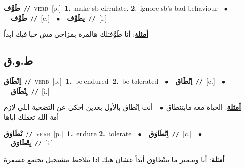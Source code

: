 \documentclass[10pt,a4paper,twoside]{article} %
\begin{document}
\begin{multicols}{2}
{\setlength\topsep{0pt}\textbf{\foreignlanguage{arabic}{طَوَّف}}\ {\color{gray}\texttt{//}\color{black}}\ \textsc{verb}\ [p.]\ \textbf{1.}~make sb circulate.  \textbf{2.}~ignore sb's bad behaviour\ \ $\bullet$\ \ \setlength\topsep{0pt}\textbf{\foreignlanguage{arabic}{طَوِّف}}\ {\color{gray}\texttt{//}\color{black}}\ [c.]\ \ $\bullet$\ \ \setlength\topsep{0pt}\textbf{\foreignlanguage{arabic}{يطَوِّف}}\ {\color{gray}\texttt{//}\color{black}}\ [i.]\  \begin{flushright}\color{gray}\foreignlanguage{arabic}{\textbf{\underline{\foreignlanguage{arabic}{أمثلة}}}: أنا طَوَّفتلك هالمرة بمزاجي مش حبا فيك أبداً}\end{flushright}\color{black}} \vspace{2mm}

\vspace{-3mm}
\subsection*{\color{blue}\foreignlanguage{arabic}{ط.و.ق}\color{blue}{}} 

{\setlength\topsep{0pt}\textbf{\foreignlanguage{arabic}{اِنْطَاق}}\ {\color{gray}\texttt{//}\color{black}}\ \textsc{verb}\ [p.]\ \textbf{1.}~be endured.  \textbf{2.}~be tolerated\ \ $\bullet$\ \ \setlength\topsep{0pt}\textbf{\foreignlanguage{arabic}{اِنْطَاق}}\ {\color{gray}\texttt{//}\color{black}}\ [c.]\ \ $\bullet$\ \ \setlength\topsep{0pt}\textbf{\foreignlanguage{arabic}{يِنْطَاق}}\ {\color{gray}\texttt{//}\color{black}}\ [i.]\  \begin{flushright}\color{gray}\foreignlanguage{arabic}{\textbf{\underline{\foreignlanguage{arabic}{أمثلة}}}: الحياة معه مابتنطاق\ $\bullet$\ \  أنت اِنْطاق بالأول بعدين احكي عن التضحية اللي لازم أمة الله تعملك اياها}\end{flushright}\color{black}} \vspace{2mm}

{\setlength\topsep{0pt}\textbf{\foreignlanguage{arabic}{تْطَاوَق}}\ {\color{gray}\texttt{//}\color{black}}\ \textsc{verb}\ [p.]\ \textbf{1.}~endure  \textbf{2.}~tolerate\ \ $\bullet$\ \ \setlength\topsep{0pt}\textbf{\foreignlanguage{arabic}{اِتْطَاوَق}}\ {\color{gray}\texttt{//}\color{black}}\ [c.]\ \ $\bullet$\ \ \setlength\topsep{0pt}\textbf{\foreignlanguage{arabic}{يِتْطَاوَق}}\ {\color{gray}\texttt{//}\color{black}}\ [i.]\  \begin{flushright}\color{gray}\foreignlanguage{arabic}{\textbf{\underline{\foreignlanguage{arabic}{أمثلة}}}: أنا وسمير ما بنتْطاوَق أبداً عشان هيك اذا بتلاحظ مشتحيل نجتمع عسفرة}\end{flushright}\color{black}} \vspace{2mm}


\end{multicols}
\end{document}
